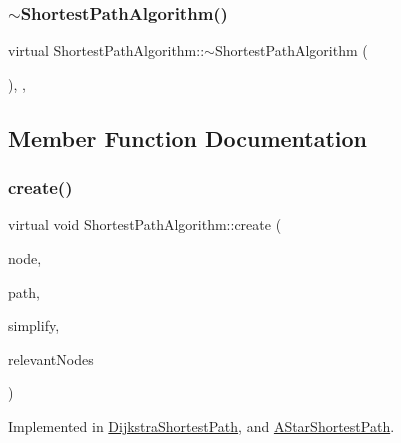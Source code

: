 \subsubsection{\texorpdfstring{$\sim$ShortestPathAlgorithm()}{~ShortestPathAlgorithm()}}
{\footnotesize\ttfamily virtual Shortest\+Path\+Algorithm\+::$\sim$\+Shortest\+Path\+Algorithm (\begin{DoxyParamCaption}{ }\end{DoxyParamCaption})\hspace{0.3cm}{\ttfamily [virtual]}, {\ttfamily [default]}, {\ttfamily [noexcept]}}



\subsection{Member Function Documentation}
\mbox{\label{class_shortest_path_algorithm_a2d4fc30e24f6bf057111f632ea0633bf}} 
\subsubsection{\texorpdfstring{create()}{create()}}
{\footnotesize\ttfamily virtual void Shortest\+Path\+Algorithm\+::create (\begin{DoxyParamCaption}\item[{std\+::shared\+\_\+ptr$<$ \mbox{\hyperlink{class_node_data}{Node\+Data}} $>$}]{node,  }\item[{Q\+String}]{path,  }\item[{bool}]{simplify,  }\item[{const Q\+List$<$ std\+::shared\+\_\+ptr$<$ \mbox{\hyperlink{class_node_data}{Node\+Data}} $>$ $>$ \&}]{relevant\+Nodes }\end{DoxyParamCaption})\hspace{0.3cm}{\ttfamily [pure virtual]}}



Implemented in \mbox{\hyperlink{class_dijkstra_shortest_path_a4b3a7a806a0da2b4ddc4fc5a1f769f24}{Dijkstra\+Shortest\+Path}}, and \mbox{\hyperlink{class_a_star_shortest_path_a4df475e3ab2c828313160ab940e7e4f3}{A\+Star\+Shortest\+Path}}.

\mbox{\label{class_shortest_path_algorithm_ab53826557f9af1fe47d66c32d2f77b79}} 

